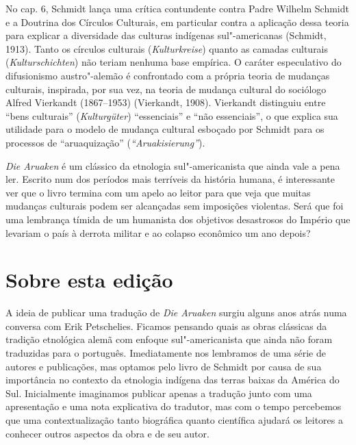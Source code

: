 No cap. 6, Schmidt lança uma crítica contundente contra Padre Wilhelm
Schmidt e a Doutrina dos Círculos Culturais, em particular contra a
aplicação dessa teoria para explicar a diversidade das culturas
indígenas sul"-americanas (Schmidt, 1913). Tanto os círculos culturais
(\emph{Kulturkreise}) quanto as camadas culturais
(\emph{Kulturschichten}) não teriam nenhuma base empírica. O caráter
especulativo do difusionismo austro"-alemão é confrontado com a própria
teoria de mudanças culturais, inspirada, por sua vez, na teoria de
mudança cultural do sociólogo Alfred Vierkandt (1867--1953) (Vierkandt,
1908). Vierkandt distinguiu entre ``bens culturais''
(\emph{Kulturgüter}) ``essenciais'' e ``não essenciais'', o que explica
sua utilidade para o modelo de mudança cultural esboçado por Schmidt
para os processos de ``aruaquização'' (\emph{``Aruakisierung''}).

\emph{Die Aruaken} é um clássico da etnologia sul"-americanista que ainda
vale a pena ler. Escrito num dos períodos mais terríveis da história
humana, é interessante ver que o livro termina com um apelo ao leitor
para que veja que muitas mudanças culturais podem ser alcançadas sem
imposições violentas. Será que foi uma lembrança tímida de um humanista
dos objetivos desastrosos do Império que levariam o país à derrota
militar e ao colapso econômico um ano depois?

\section{Sobre esta edição}

A ideia de publicar uma tradução de \emph{Die Aruaken} surgiu alguns
anos atrás numa conversa com Erik Petschelies. Ficamos pensando quais as
obras clássicas da tradição etnológica alemã com enfoque sul"-americanista
que ainda não foram traduzidas para o português. Imediatamente nos
lembramos de uma série de autores e publicações, mas optamos pelo livro
de Schmidt por causa de sua importância no contexto da etnologia
indígena das terras baixas da América do Sul. Inicialmente imaginamos
publicar apenas a tradução junto com uma apresentação e uma nota
explicativa do tradutor, mas com o tempo percebemos que uma
contextualização tanto biográfica quanto científica ajudará os leitores
a conhecer outros aspectos da obra e de seu autor.

